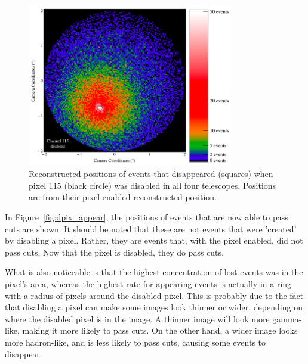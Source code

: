\begin{figure}[!ht]
  \centering
  \includegraphics[width=0.8\textwidth]{images/disabled_pixel/disappearing_events}
  \caption[Events That Disappear when Disabling Camera Pixels]{
    Reconstructed positions of events that disappeared (squares) when pixel 115 (black circle) was disabled in all four telescopes.
    Positions are from their pixel-enabled reconstructed position.
  }
  \label{fig:dpix_disappear}
\end{figure}

In Figure~\ref{fig:dpix_appear}, the positions of events that are now able to pass cuts are shown.
It should be noted that these are not events that were 'created' by disabling a pixel.
Rather, they are events that, with the pixel enabled, did not pass cuts.
Now that the pixel is disabled, they do pass cuts.

What is also noticeable is that the highest concentration of lost events was in the pixel's area, whereas the highest rate for appearing events is actually in a ring with a radius of  pixels around the disabled pixel.
This is probably due to the fact that disabling a pixel can make some images look thinner or wider, depending on where the disabled pixel is in the image.
A thinner image will look more gamma-like, making it more likely to pass cuts.
On the other hand, a wider image looks more hadron-like, and is less likely to pass cuts, causing some events to disappear.

